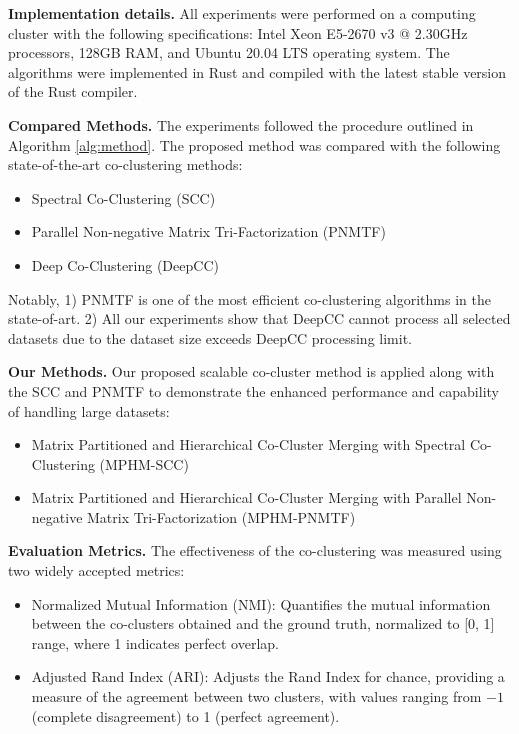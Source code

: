 \documentclass[journal]{IEEEtran}
\renewcommand{\cite}[1]{~\autocite{#1}}
\begin{document}
\textbf{Implementation details.}
All experiments were performed on a computing cluster with the following specifications: Intel Xeon E5-2670 v3 @ 2.30GHz processors, 128GB RAM, and Ubuntu 20.04 LTS operating system. The algorithms were implemented in Rust and compiled with the latest stable version of the Rust compiler.

\textbf{Compared Methods.}
The experiments followed the procedure outlined in Algorithm \ref{alg:method}. The proposed method was compared with the following state-of-the-art co-clustering methods:

\begin{itemize}
  \item Spectral Co-Clustering (SCC) \cite{dhillon2001CoclusteringDocumentsWords}
  \item Parallel Non-negative Matrix Tri-Factorization (PNMTF)\cite{chen2023ParallelNonNegativeMatrix}
  \item Deep Co-Clustering (DeepCC)\cite{dongkuanxu2019DeepCoClustering}
\end{itemize}

Notably, 1) PNMTF is one of the most efficient co-clustering algorithms in the state-of-art. 2) All our experiments show that DeepCC cannot process all selected datasets due to the dataset size exceeds DeepCC processing limit.

\textbf{Our Methods.} Our proposed scalable co-cluster method is applied along with the SCC and PNMTF to demonstrate the enhanced performance and capability of handling large datasets:
\begin{itemize}
  \item Matrix Partitioned and Hierarchical Co-Cluster Merging with Spectral Co-Clustering (MPHM-SCC)
  \item Matrix Partitioned and Hierarchical Co-Cluster Merging with Parallel Non-negative Matrix Tri-Factorization (MPHM-PNMTF)
\end{itemize}

\textbf{Evaluation Metrics.}
The effectiveness of the co-clustering was measured using two widely accepted metrics:

\begin{itemize}
  \item Normalized Mutual Information (NMI): Quantifies the mutual information between the co-clusters obtained and the ground truth, normalized to [0, 1] range, where 1 indicates perfect overlap.
  \item Adjusted Rand Index (ARI): Adjusts the Rand Index for chance, providing a measure of the agreement between two clusters, with values ranging from $-1$ (complete disagreement) to 1 (perfect agreement).
\end{itemize}
\end{document}
